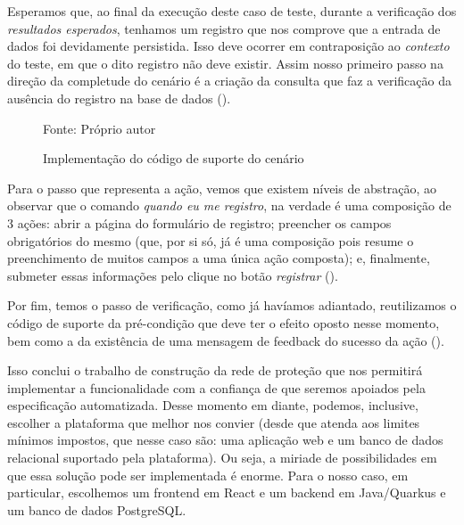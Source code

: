   Esperamos que, ao final da execução deste caso de teste, durante a verificação dos \emph{resultados esperados}, tenhamos um registro que nos comprove que a entrada de dados foi devidamente persistida. Isso deve ocorrer em contraposição ao \emph{contexto} do teste, em que o dito registro não deve existir. Assim nosso primeiro passo na direção da completude do cenário é a criação da consulta que faz a verificação da ausência do registro na base de dados ().

  \begin{figure}[h]
    \centering
    \caption{Implementação do código de suporte do cenário}
    Fonte: Próprio autor
    \label{fig:suporte-cenario}
  \end{figure}

  Para o passo que representa a ação, vemos que existem níveis de abstração, ao observar que o comando \emph{quando eu me registro}, na verdade é uma composição de 3 ações: abrir a página do formulário de registro; preencher os campos obrigatórios do mesmo (que, por si só, já é uma composição pois resume o preenchimento de muitos campos a uma única ação composta); e, finalmente, submeter essas informações pelo clique no botão \emph{registrar} ().

  Por fim, temos o passo de verificação, como já havíamos adiantado, reutilizamos o código de suporte da pré-condição que deve ter o efeito oposto nesse momento, bem como a da existência de uma mensagem de feedback do sucesso da ação ().

  Isso conclui o trabalho de construção da rede de proteção que nos permitirá implementar a funcionalidade com a confiança de que seremos apoiados pela especificação automatizada. Desse momento em diante, podemos, inclusive, escolher a plataforma que melhor nos convier (desde que atenda aos limites mínimos impostos, que nesse caso são: uma aplicação web e um banco de dados relacional suportado pela plataforma). Ou seja, a miriade de possibilidades em que essa solução pode ser implementada é enorme. Para o nosso caso, em particular, escolhemos um frontend em React e um backend em Java/Quarkus e um banco de dados PostgreSQL.

